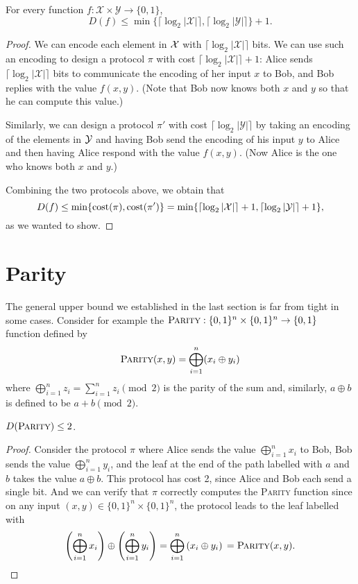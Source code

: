 \begin{theorem}
For every function $f : \mathcal{X} \times \mathcal{Y} \to \{0,1\}$, 
\[
D(f) \le \min\{\lceil \log_2 |\mathcal{X}| \rceil, \lceil \log_2 |\mathcal{Y}| \rceil\} + 1.
\]
\end{theorem}

\begin{proof}
We can encode each element in $\mathcal{X}$ with $\lceil \log_2 |\mathcal{X}| \rceil$ bits. We can use such an encoding to design a protocol $\pi$ with cost $\lceil \log_2 |\mathcal{X}| \rceil + 1$: Alice sends $\lceil \log_2 |\mathcal{X}| \rceil$ bits to communicate the encoding of her input $x$ to Bob, and Bob replies with the value $f(x,y)$. (Note that Bob now knows both $x$ and $y$ so that he can compute this value.)

Similarly, we can design a protocol $\pi'$ with cost $\lceil \log_2 |\mathcal{Y}| \rceil$ by taking an encoding of the elements in $\mathcal{Y}$ and having Bob send the encoding of his input $y$ to Alice and then having Alice respond with the value $f(x,y)$. (Now Alice is the one who knows both $x$ and $y$.)

Combining the two protocols above, we obtain that
\[
D(f) \le \min\{ \mathrm{cost}(\pi), \mathrm{cost}(\pi') \} = \min\{\lceil \log_2 |\mathcal{X}| \rceil + 1, \lceil \log_2 |\mathcal{Y}| \rceil + 1\},
\]
as we wanted to show.
\end{proof}


\newpage \section{Parity}
The general upper bound we established in the last section is far from tight in some cases. Consider for example the $\textsc{Parity} : \{0,1\}^n \times \{0,1\}^n \to \{0,1\}$ function defined by
\[
\textsc{Parity}(x,y) = \bigoplus_{i=1}^n (x_i \oplus y_i) 
\]
where $\bigoplus_{i=1}^n z_i = \sum_{i=1}^n z_i \pmod{2}$ is the parity of the sum and, similarly, $a \oplus b$ is defined to be $a+b \pmod{2}$.

\begin{theorem}
$D(\textsc{Parity}) \le 2$.
\end{theorem}

\begin{proof}
Consider the protocol $\pi$ where Alice sends the value $\bigoplus_{i=1}^n x_i$ to Bob, Bob sends the value $\bigoplus_{i=1}^n y_i$, and the leaf at the end of the path labelled with $a$ and $b$ takes the value $a \oplus b$. This protocol has cost 2, since Alice and Bob each send a single bit. And we can verify that $\pi$ correctly computes the \textsc{Parity} function since on any input $(x,y) \in \{0,1\}^n \times \{0,1\}^n$, the protocol leads to the leaf labelled with
\[
\left( \bigoplus_{i=1}^n x_i \right) \oplus 
\left( \bigoplus_{i=1}^n y_i \right) 
=  \bigoplus_{i=1}^n \left(x_i \oplus y_i \right) \\
= \textsc{Parity}(x,y). \qedhere
\]
\end{proof}


